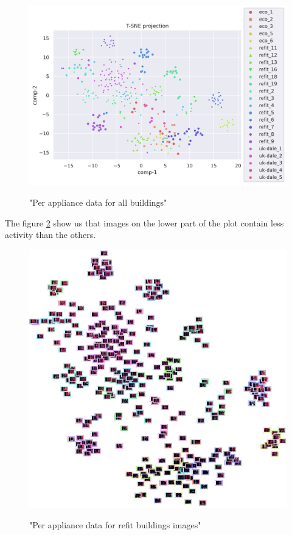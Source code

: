 \begin{figure}[H]
	\centering
	\caption{"Per appliance data for all buildings"}
	\includegraphics[width=1.2\textwidth]{Figures/TSNE/TSNE_per_appliance/all/scatter_all_kettle.png}
	\label{fig:tsne_pa_scatter_all_kettle}
\end{figure}

The figure \ref{fig:tsne_pa_img_scatter_all_kettle} show us that images on the lower part 
of the plot contain less activity than the others.

\begin{figure}[H]
	\centering
	\caption{"Per appliance data for refit buildings images"}
	\includegraphics[width=.9\textwidth]{Figures/TSNE/TSNE_per_appliance/all/img_scatter_allkettle.png}
	\label{fig:tsne_pa_img_scatter_all_kettle}
\end{figure}

